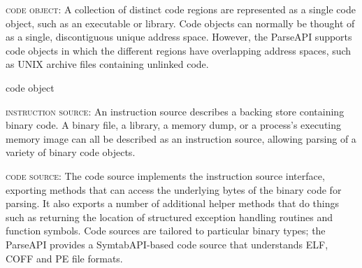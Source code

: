 %
\begin{itemize}[leftmargin=0pt,label=$\circ$]

{\item {\scshape code object}: A collection of distinct code regions
are represented as a single code object, such as an executable or
library. Code objects can normally be thought of as a single,
discontiguous unique address space. However, the ParseAPI supports
code objects in which the different regions have overlapping address
spaces, such as UNIX archive files containing unlinked code.  }%
code object

{\item {\scshape instruction source}: An instruction source describes
a backing store containing binary code. A binary file, a library, a
memory dump, or a process's executing memory image can all be
described as an instruction source, allowing parsing of a variety of
binary code objects.  }%

{\item {\scshape code source}: The code source implements the
instruction source interface, exporting methods that can access the
underlying bytes of the binary code for parsing. It also exports a
number of additional helper methods that do things such as returning
the location of structured exception handling routines and function
symbols. Code sources are tailored to particular binary types; the
ParseAPI provides a SymtabAPI-based code source that understands ELF,
COFF and PE file formats.  }%

\end{itemize}
